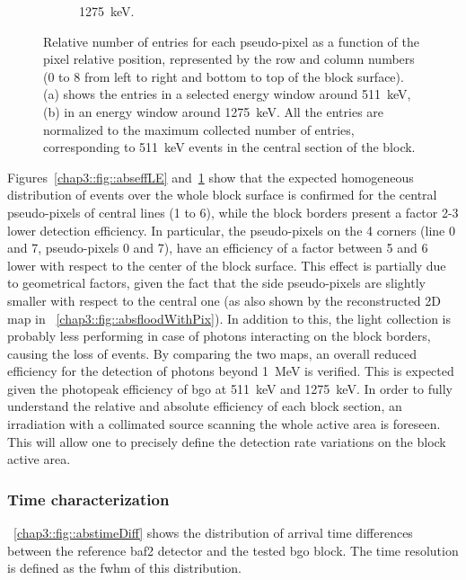 \begin{figure}
\begin{subfigure}[t]{0.5\textwidth}
\caption{1275~keV.}
\label{chap3::fig::abseffHE}
\end{subfigure}
\caption{Relative number of entries for each pseudo-pixel as a function of the pixel relative position, represented by the row and column numbers (0 to 8 from left to right and bottom to top of the block surface). \figurename (a) shows the entries in a selected energy window around 511~keV, \figurename (b) in an energy window around 1275~keV. All the entries are normalized to the maximum collected number of entries, corresponding to 511~keV events in the central section of the block.}
\label{chap3::fig::absefficiency}
\end{figure}

Figures~\ref{chap3::fig::abseffLE} and~\ref{chap3::fig::abseffHE} show that the expected homogeneous distribution of events over the whole block surface is confirmed for the central pseudo-pixels of central lines (1 to 6), while the block borders present a factor 2-3 lower detection efficiency. In particular, the pseudo-pixels on the 4 corners (line 0 and 7, pseudo-pixels 0 and 7), have an efficiency of a factor between 5 and 6 lower with respect to the center of the block surface. This effect is partially due to geometrical factors, given the fact that the side pseudo-pixels are slightly smaller with respect to the central one (as also shown by the reconstructed 2D map in \figurename~\ref{chap3::fig::absfloodWithPix}). In addition to this, the light collection is probably less performing in case of photons interacting on the block borders, causing the loss of events. By comparing the two maps, an overall reduced efficiency for the detection of photons beyond 1~MeV is verified. This is expected given the photopeak efficiency of \gls{bgo} at 511~keV and 1275~keV. In order to fully understand the relative and absolute efficiency of each block section, an irradiation with a collimated source scanning the whole active area is foreseen. This will allow one to precisely define the detection rate variations on the block active area.

\subsubsection{Time characterization}\label{chap3::subsubsec::timeChar}

\figurename~\ref{chap3::fig::abstimeDiff} shows the distribution of arrival time differences between the reference \gls{baf2} detector and the tested \gls{bgo} block. The time resolution is defined as the \gls{fwhm} of this distribution.


